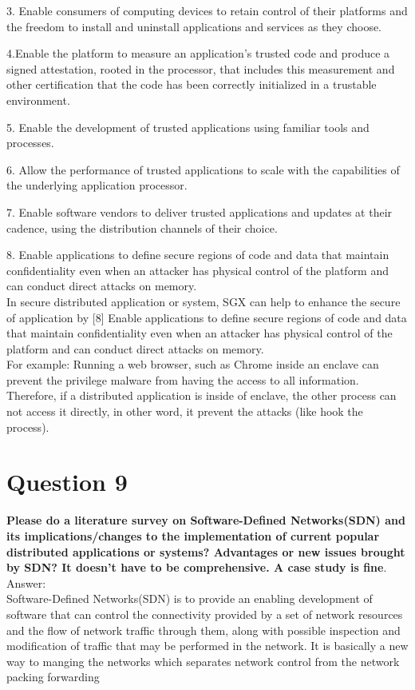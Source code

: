 \documentclass{article}
\begin{document}
3. Enable consumers of computing devices to retain control of their platforms and the freedom to install and uninstall applications and services as they choose.

4.Enable the platform to measure an application’s trusted code and produce a signed attestation, rooted in the processor, that includes this measurement and other certification that the code has been correctly initialized in a trustable environment.

5. Enable the development of trusted applications using familiar tools and processes.

6. Allow the performance of trusted applications to scale with the capabilities of the underlying application processor.

7. Enable software vendors to deliver trusted applications and updates at their cadence, using the distribution channels of their choice.

8. Enable applications to define secure regions of code and data that maintain confidentiality even when an attacker has physical control of the platform and can conduct direct attacks on memory.\\

In secure distributed application or system, SGX can help to enhance the secure of application by [8] Enable applications to define secure regions of code and data that maintain confidentiality even when an attacker has physical control of the platform and can conduct direct attacks on memory.\\

For example: Running  a web browser, such as Chrome inside an enclave can prevent the privilege malware from having the access to all information. Therefore, if a distributed application is inside of enclave, the other process can not access it directly, in other word, it prevent the attacks (like hook the process).

\clearpage

\section{Question 9}
\textbf{Please do a literature survey on Software-Defined Networks(SDN) and its implications/changes to the implementation of current popular distributed applications or systems? Advantages or new issues brought by SDN? It doesn’t have to be comprehensive. A case study is fine}.\\

Answer:\\
Software-Defined Networks(SDN) is to provide an enabling development of software that can control the connectivity provided by a set of network resources and the flow of network traffic through them, along with possible inspection and modification of traffic that may be performed in the network. It is basically a new way to manging the networks which separates network control from the network packing forwarding\\
\end{document}
